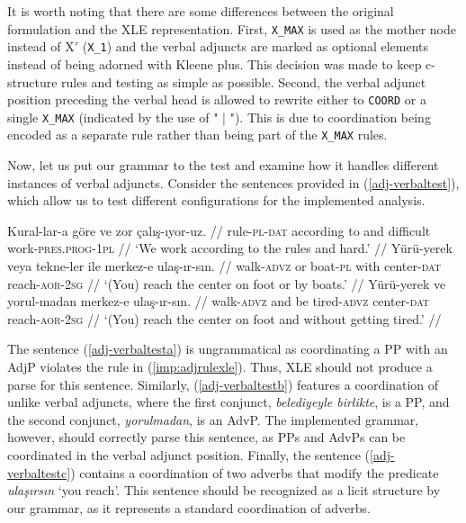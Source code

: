 It is worth noting that there are some differences between the original formulation and the XLE representation. First, \texttt{X\_MAX} is used as the mother node instead of X$'$ (\texttt{X\_1}) and the verbal adjuncts are marked as optional elements instead of being adorned with Kleene plus. This decision was made to keep c-structure rules and testing as simple as possible.  Second, the verbal adjunct position preceding the verbal head is allowed to rewrite either to \texttt{COORD} or a single \texttt{X\_MAX} (indicated by the use of " | "). This is due to coordination being encoded as a separate rule rather than being part of the \texttt{X\_MAX} rules.

Now, let us put our grammar to the test and examine how it handles different instances of verbal adjuncts. Consider the sentences provided in (\ref{adj-verbaltest}), which allow us to test different configurations for the implemented analysis.

\pex[glspace=!1em,everygla={},everyglb={},aboveglbskip=-.15ex, interpartskip=15pt]
\label{adj-verbaltest}
\a\label{adj-verbaltesta} 
\begingl
\gla\ljudge{*}Kural-lar-a göre ve zor çalış-ıyor-uz. //
\glb rule-\textsc{pl}-\textsc{dat} {according to} and difficult work-\textsc{pres.prog}-\textsc{1pl} //
\glft `We work according to the rules and hard.' //
\endgl
\a\label{adj-verbaltestb} 
\begingl
\gla Yürü-yerek veya tekne-ler ile merkez-e ulaş-ır-sın. //
\glb walk-\textsc{advz} or boat-\textsc{pl} with center-\textsc{dat} reach-\textsc{aor}-\textsc{2sg} //
\glft `(You) reach the center on foot or by boats.' //
\endgl
\a\label{adj-verbaltestc} 
\begingl
\gla Yürü-yerek ve yorul-madan merkez-e ulaş-ır-sın. //
\glb walk-\textsc{advz} and {be tired}-\textsc{advz} center-\textsc{dat} reach-\textsc{aor}-\textsc{2sg} //
\glft `(You) reach the center on foot and without getting tired.' //
\endgl
\xe 

The sentence (\ref{adj-verbaltesta}) is ungrammatical as coordinating a PP with an AdjP violates the rule in (\ref{imp:adjrulexle}). Thus, XLE should not produce a parse for this sentence. Similarly, (\ref{adj-verbaltestb}) features a coordination of unlike verbal adjuncts, where the first conjunct, \textit{belediyeyle birlikte}, is a PP, and the second conjunct, \textit{yorulmadan}, is an AdvP. The implemented grammar, however, should correctly parse this sentence, as PPs and AdvPs can be coordinated in the verbal adjunct position. Finally, the sentence (\ref{adj-verbaltestc}) contains a coordination of two adverbs that modify the predicate \textit{ulaşırsın} `you reach'. This sentence should be recognized as a licit structure by our grammar, as it represents a standard coordination of adverbs.


